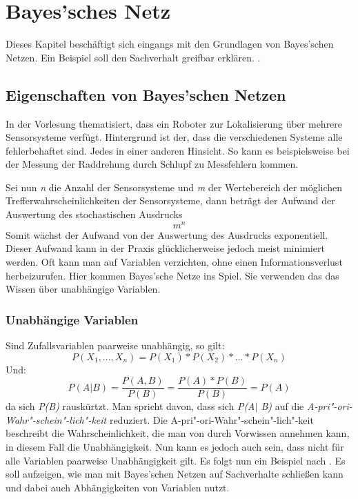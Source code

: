 \chapter{Bayes'sches Netz}
Dieses Kapitel beschäftigt sich eingangs mit den Grundlagen von Bayes'schen Netzen. Ein Beispiel soll den Sachverhalt greifbar erklären.
.
\section{Eigenschaften von Bayes'schen Netzen}
In der Vorlesung \cite{Strand17} thematisiert, dass ein Roboter zur Lokalisierung über mehrere Sensorsysteme verfügt. Hintergrund ist der, dass die verschiedenen Systeme alle fehlerbehaftet sind. Jedes in einer anderen Hinsicht. So kann es beispielsweise bei der Messung der Raddrehung durch Schlupf zu Messfehlern kommen.

Sei nun \textit{n} die Anzahl der Sensorsysteme und \textit{m} der Wertebereich der möglichen Trefferwahrscheinlichkeiten der Sensorsysteme, dann beträgt der Aufwand der Auswertung des stochastischen Ausdrucks \[ m^n\] Somit wächst der Aufwand von der Auswertung des Ausdrucks exponentiell. Dieser Aufwand kann in der Praxis glücklicherweise jedoch meist minimiert werden. Oft kann man auf Variablen verzichten, ohne einen Informationsverlust herbeizurufen. Hier kommen Bayes'sche Netze ins Spiel. Sie verwenden das das Wissen über unabhängige Variablen. 
\subsection{Unabhängige Variablen}
Sind Zufallsvariablen paarweise unabhängig, so gilt: \[ P(X_1, ..., X_n) = P(X_1) * P(X_2) * ... * P(X_n)\] 
Und: \[ P(A\vert B) = \frac{P(A,B)}{P(B)} = \frac{P(A) * P(B)}{P(B)}  = P(A) \] da sich \textit{P(B)} rauskürtzt. Man spricht davon, dass sich \textit{P(A$\vert$ B)} auf die \textit{A-pri"-ori-Wahr"-schein"-lich"-keit} reduziert. Die A-pri"-ori-Wahr"-schein"-lich"-keit beschreibt die Wahrscheinlichkeit, die man von durch Vorwissen annehmen kann, in diesem Fall die Unabhängigkeit. Nun kann es jedoch auch sein, dass nicht für alle Variablen paarweise Unabhängigkeit gilt. Es folgt nun ein Beispiel nach \cite{Perl88}. Es soll aufzeigen, wie man mit Bayes'schen Netzen auf Sachverhalte schließen kann und dabei auch Abhängigkeiten von Variablen nutzt. 

